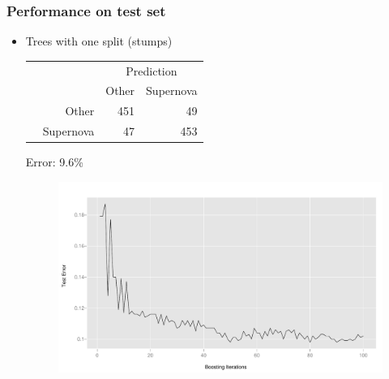 \documentclass{beamer}
\begin{document}
\begin{frame}
	\frametitle{Performance on test set}
	\begin{itemize}
		\item Trees with one split (stumps)
		\begin{table}
		\begin{tabular}{cr|rr}
		& & \multicolumn{2}{c}{Prediction}\\
		& & Other & Supernova\\
		\hline
		\multirow{2}{*}{\rotatebox{90}{Actual}} & Other &  451 &  49\\
		& Supernova & 47 &  453\\
		\end{tabular}
		\end{table}
		Error: 9.6\%
		\begin{figure}
		\includegraphics{error.pdf}
		\end{figure}
			\end{itemize}

\end{frame}
\end{document}
